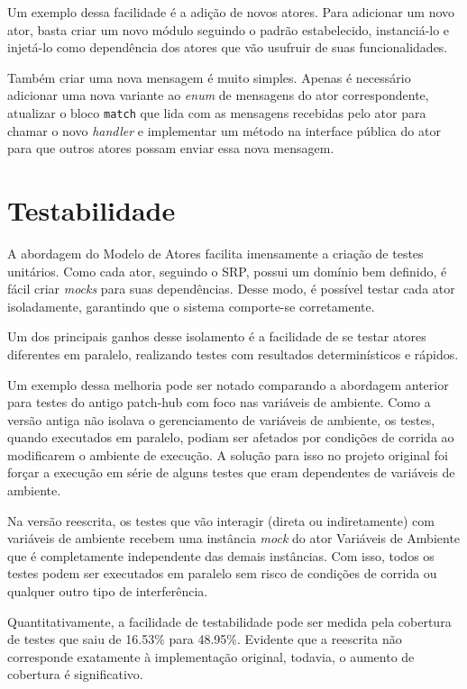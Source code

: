 Um exemplo dessa facilidade é a adição de novos atores. Para adicionar um novo ator, basta criar um novo módulo seguindo o padrão estabelecido, instanciá-lo e injetá-lo como dependência dos atores que vão usufruir de suas funcionalidades.

Também criar uma nova mensagem é muito simples. Apenas é necessário adicionar uma nova variante ao \emph{enum} de mensagens do ator correspondente, atualizar o bloco \texttt{match} que lida com as mensagens recebidas pelo ator para chamar o novo \emph{handler} e implementar um método na interface pública do ator para que outros atores possam enviar essa nova mensagem.

\section{Testabilidade}

A abordagem do Modelo de Atores facilita imensamente a criação de testes unitários. Como cada ator, seguindo o SRP, possui um domínio bem definido, é fácil criar \emph{mocks} para suas dependências. Desse modo, é possível testar cada ator isoladamente, garantindo que o sistema comporte-se corretamente.

Um dos principais ganhos desse isolamento é a facilidade de se testar atores diferentes em paralelo, realizando testes com resultados determinísticos e rápidos.

Um exemplo dessa melhoria pode ser notado comparando a abordagem anterior para testes do antigo patch-hub com foco nas variáveis de ambiente. Como a versão antiga não isolava o gerenciamento de variáveis de ambiente, os testes, quando executados em paralelo, podiam ser afetados por condições de corrida ao modificarem o ambiente de execução. A solução para isso no projeto original foi forçar a execução em série de alguns testes que eram dependentes de variáveis de ambiente.

Na versão reescrita, os testes que vão interagir (direta ou indiretamente) com variáveis de ambiente recebem uma instância \emph{mock} do ator Variáveis de Ambiente que é completamente independente das demais instâncias. Com isso, todos os testes podem ser executados em paralelo sem risco de condições de corrida ou qualquer outro tipo de interferência.


Quantitativamente, a facilidade de testabilidade pode ser medida pela cobertura de testes que saiu de 16.53\% para 48.95\%. Evidente que a reescrita não corresponde exatamente à implementação original, todavia, o aumento de cobertura é significativo.



